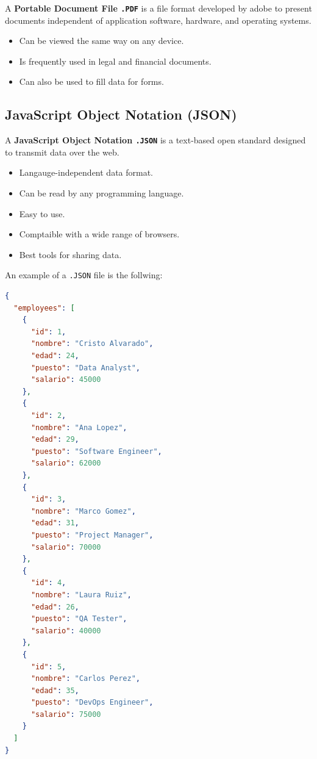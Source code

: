 \documentclass[../../ibm_data_analysis.tex]{subfiles}
\begin{document}
    \begin{mydef}
        A \textbf{Portable Document File \lstinline|.PDF|} is a file format developed by adobe to present documents independent of application software, hardware, and operating systems.
        \begin{itemize}
            \item Can be viewed the same way on any device.
            \item Is frequently used in legal and financial documents.
            \item Can also be used to fill data for forms. 
        \end{itemize}
    \end{mydef}

    \subsection{JavaScript Object Notation (JSON)}

    \begin{mydef}
        A \textbf{JavaScript Object Notation \lstinline|.JSON|} is a text-based open standard designed to transmit data over the web.
        \begin{itemize}
            \item Langauge-independent data format.
            \item Can be read by any programming language.
            \item Easy to use.
            \item Comptaible with a wide range of browsers.
            \item Best tools for sharing data.
        \end{itemize}
    \end{mydef}

    \begin{exa}
        An example of a \lstinline|.JSON| file is the follwing:
        \begin{lstlisting}[caption={\lstinline|.JSON| File Content Example.},label=figure:JSON_example, language = json]
{
  "employees": [
    {
      "id": 1,
      "nombre": "Cristo Alvarado",
      "edad": 24,
      "puesto": "Data Analyst",
      "salario": 45000
    },
    {
      "id": 2,
      "nombre": "Ana Lopez",
      "edad": 29,
      "puesto": "Software Engineer",
      "salario": 62000
    },
    {
      "id": 3,
      "nombre": "Marco Gomez",
      "edad": 31,
      "puesto": "Project Manager",
      "salario": 70000
    },
    {
      "id": 4,
      "nombre": "Laura Ruiz",
      "edad": 26,
      "puesto": "QA Tester",
      "salario": 40000
    },
    {
      "id": 5,
      "nombre": "Carlos Perez",
      "edad": 35,
      "puesto": "DevOps Engineer",
      "salario": 75000
    }
  ]
}
        \end{lstlisting}
    \end{exa}
\end{document}
